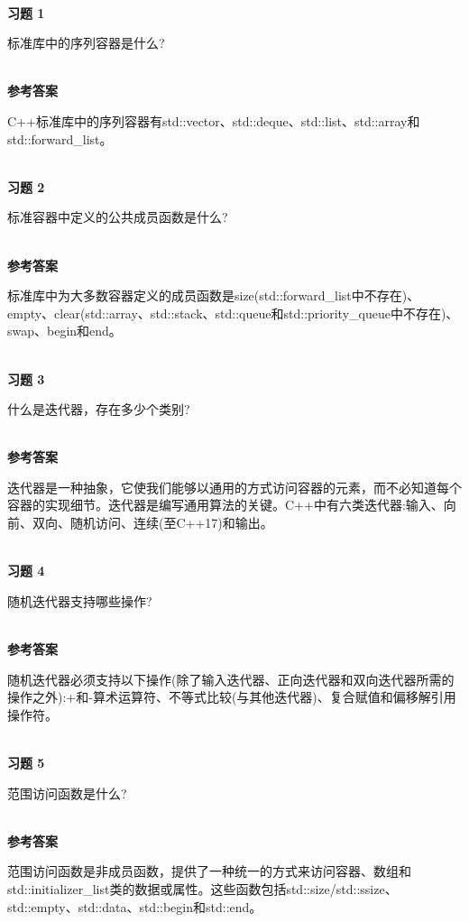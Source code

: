\hspace*{\fill} \\ %
\noindent
\textbf{习题 1}

标准库中的序列容器是什么?

\hspace*{\fill} \\ %
\noindent
\textbf{参考答案}

C++标准库中的序列容器有std::vector、std::deque、std::list、std::array和std::forward\_list。


\hspace*{\fill} \\ %
\noindent
\textbf{习题 2}

标准容器中定义的公共成员函数是什么?

\hspace*{\fill} \\ %
\noindent
\textbf{参考答案}

标准库中为大多数容器定义的成员函数是size(std::forward\_list中不存在)、empty、clear(std::array、std::stack、std::queue和std::priority\_queue中不存在)、swap、begin和end。

\hspace*{\fill} \\ %
\noindent
\textbf{习题 3}

什么是迭代器，存在多少个类别?

\hspace*{\fill} \\ %
\noindent
\textbf{参考答案}

迭代器是一种抽象，它使我们能够以通用的方式访问容器的元素，而不必知道每个容器的实现细节。迭代器是编写通用算法的关键。C++中有六类迭代器:输入、向前、双向、随机访问、连续(至C++17)和输出。

\hspace*{\fill} \\ %
\noindent
\textbf{习题 4}

随机迭代器支持哪些操作?

\hspace*{\fill} \\ %
\noindent
\textbf{参考答案}

随机迭代器必须支持以下操作(除了输入迭代器、正向迭代器和双向迭代器所需的操作之外):+和-算术运算符、不等式比较(与其他迭代器)、复合赋值和偏移解引用操作符。

\hspace*{\fill} \\ %
\noindent
\textbf{习题 5}

范围访问函数是什么?

\hspace*{\fill} \\ %
\noindent
\textbf{参考答案}

范围访问函数是非成员函数，提供了一种统一的方式来访问容器、数组和std::initializer\_list类的数据或属性。这些函数包括std::size/std::ssize、std::empty、std::data、std::begin和std::end。












